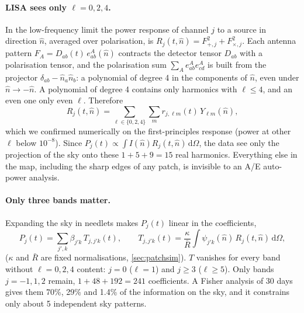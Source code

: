 \documentclass[11pt,a4paper]{article}
\newcommand{\dd}{\mathrm{d}}
\begin{document}
\paragraph{LISA sees only $\ell=0,2,4$.} In the low-frequency limit the power response
of channel $j$ to a source in direction $\hat n$, averaged over polarisation, is
$R_j(t,\hat n)=F_{+,j}^2+F_{\times,j}^2$. Each antenna pattern
$F_{A}=D_{ab}(t)\,e^A_{ab}(\hat n)$ contracts the detector tensor $D_{ab}$ with a
polarisation tensor, and the polarisation sum
$\sum_A e^A_{ab}e^A_{cd}$ is built from the projector $\delta_{ab}-\hat n_a\hat n_b$: a
polynomial of degree 4 in the components of $\hat n$, even under $\hat n\to-\hat n$. A
polynomial of degree 4 contains only harmonics with $\ell\le4$, and an even one only even
$\ell$. Therefore
\begin{equation}
  R_j(t,\hat n) = \sum_{\ell\in\{0,2,4\}}\sum_m r_{j,\ell m}(t)\,Y_{\ell m}(\hat n),
\end{equation}
which we confirmed numerically on the first-principles response (power at other $\ell$
below $10^{-8}$). Since $P_j(t)\propto\int I(\hat n)R_j(t,\hat n)\,\dd\Omega$, the data
see only the projection of the sky onto these $1+5+9=15$ real harmonics. Everything
else in the map, including the sharp edges of any patch, is invisible to an A/E
auto-power analysis.

\paragraph{Only three bands matter.} Expanding the sky in needlets makes $P_j(t)$
linear in the coefficients,
\begin{equation}
  P_j(t) = \sum_{j',k}\beta_{j'k}\,T_{j,j'k}(t),\qquad
  T_{j,j'k}(t) = \frac{\kappa}{\bar R}\int\psi_{j'k}(\hat n)\,R_j(t,\hat n)\,\dd\Omega,
  \label{eq:needletP}
\end{equation}
($\kappa$ and $\bar R$ are fixed normalisations, \cref{sec:patchsim}). $T$ vanishes
for every band without $\ell=0,2,4$ content: $j=0$ ($\ell=1$) and $j\ge3$
($\ell\ge5$). Only bands $j=-1,1,2$ remain, $1+48+192=241$ coefficients. A Fisher
analysis of 30 days gives them 70\%, 29\% and 1.4\% of the information on the sky,
and it constrains only about 5 independent sky patterns.
\end{document}

